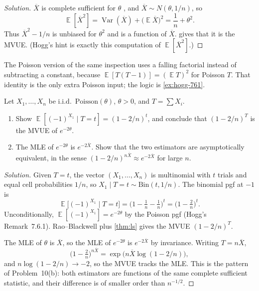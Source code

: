 \documentclass[11pt,a4paper]{article}
\DeclareMathOperator{\Var}{Var}
\DeclareMathOperator{\E}{\mathbb{E}}
\begin{document}
\begin{proof}[Solution]
\(\overline{X}\) is complete sufficient for \(\theta\) \citep[Example~7.5.2]{hogg2019}, and \(\overline{X}\sim N(\theta,1/n)\), so
\[
\E[\overline{X}^2]
=
\Var(\overline{X})+\bigl(\E\overline{X}\bigr)^2
=
\frac1n+\theta^2.
\]
Thus \(\overline{X}^2-1/n\) is unbiased for \(\theta^2\) and is a function of \(\overline{X}\).  gives that it is the MVUE. (Hogg's hint is exactly this computation of \(\E[\overline{X}^2]\).)
\end{proof}

The Poisson version of the same inspection uses a falling factorial instead of subtracting a constant, because \(\E[T(T-1)]=(\E T)^2\) for Poisson \(T\). That identity is the only extra Poisson input; the logic is \cref{ex:hogg-761}.

\begin{exercise}
\label{ex:hogg-767}
Let \(X_1,\dots,X_n\) be i.i.d.\ \(\mathrm{Poisson}(\theta)\), \(\theta>0\), and \(T=\sum X_i\).
\begin{enumerate}[label=\textup{(\alph*)}]
    \item
    Show \(\E[(-1)^{X_1}\mid T=t]=(1-2/n)^t\), and conclude that \((1-2/n)^T\) is the MVUE of \(e^{-2\theta}\).
    \item
    The MLE of \(e^{-2\theta}\) is \(e^{-2\overline{X}}\). Show that the two estimators are asymptotically equivalent, in the sense \((1-2/n)^{n\overline{X}}\approx e^{-2\overline{X}}\) for large \(n\).
\end{enumerate}
\end{exercise}

\begin{proof}[Solution]
Given \(T=t\), the vector \((X_1,\dots,X_n)\) is multinomial with \(t\) trials and equal cell probabilities \(1/n\), so \(X_1\mid T=t\sim\mathrm{Bin}(t,1/n)\). The binomial pgf at \(-1\) is
\[
\E\bigl[(-1)^{X_1}\mid T=t\bigr]
=
\bigl(1-\tfrac1n-\tfrac1n\bigr)^t
=
\bigl(1-\tfrac2n\bigr)^t.
\]
Unconditionally, \(\E[(-1)^{X_1}]=e^{-2\theta}\) by the Poisson pgf (Hogg's Remark~7.6.1). Rao--Blackwell plus \cref{thm:ls} gives the MVUE \((1-2/n)^T\).

The MLE of \(\theta\) is \(\overline{X}\), so the MLE of \(e^{-2\theta}\) is \(e^{-2\overline{X}}\) by invariance. Writing \(T=n\overline{X}\),
\[
\bigl(1-\tfrac2n\bigr)^{n\overline{X}}
=
\exp\bigl(n\overline{X}\log(1-2/n)\bigr),
\]
and \(n\log(1-2/n)\to-2\), so the MVUE tracks the MLE. This is the pattern of Problem~10(b): both estimators are functions of the same complete sufficient statistic, and their difference is of smaller order than \(n^{-1/2}\).
\end{proof}
\end{document}
